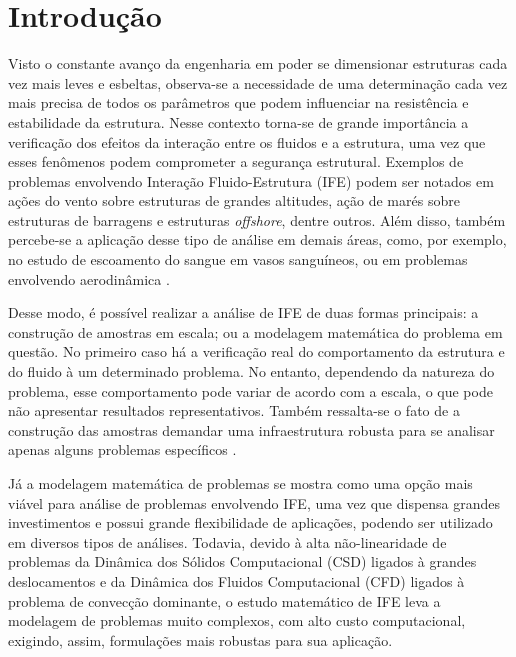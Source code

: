 \chapter{Introdução}

Visto o constante avanço da engenharia em poder se dimensionar estruturas cada vez mais leves e esbeltas, observa-se a necessidade de uma determinação cada vez mais precisa de todos os parâmetros que podem influenciar na resistência e estabilidade da estrutura. Nesse contexto torna-se de grande importância a verificação dos efeitos da interação entre os fluidos e a estrutura, uma vez que esses fenômenos podem comprometer a segurança estrutural. Exemplos de problemas envolvendo Interação Fluido-Estrutura (IFE) podem ser notados em ações do vento sobre estruturas de grandes altitudes, ação de marés sobre estruturas de barragens e estruturas \textit{offshore}, dentre outros. Além disso, também percebe-se a aplicação desse tipo de análise em demais áreas, como, por exemplo, no estudo de escoamento do sangue em vasos sanguíneos, ou em problemas envolvendo aerodinâmica \cite{sanches2014fluid, fernandes2020tecnica}.

Desse modo, é possível realizar a análise de IFE de duas formas principais: a construção de amostras em escala; ou a modelagem matemática do problema em questão. No primeiro caso há a verificação real do comportamento da estrutura e do fluido à um determinado problema. No entanto, dependendo da natureza do problema, esse comportamento pode variar de acordo com a escala, o que pode não apresentar resultados representativos. Também ressalta-se o fato de a construção das amostras demandar uma infraestrutura robusta para se analisar apenas alguns problemas específicos \cite{fernandes2020tecnica}.

Já a modelagem matemática de problemas se mostra como uma opção mais viável para análise de problemas envolvendo IFE, uma vez que dispensa grandes investimentos e possui grande flexibilidade de aplicações, podendo ser utilizado em diversos tipos de análises. Todavia, devido à alta não-linearidade de problemas da Dinâmica dos Sólidos Computacional (CSD) ligados à grandes deslocamentos e da Dinâmica dos Fluidos Computacional (CFD) ligados à problema de convecção dominante, o estudo matemático de IFE leva a modelagem de problemas muito complexos, com alto custo computacional, exigindo, assim, formulações mais robustas para sua aplicação.

